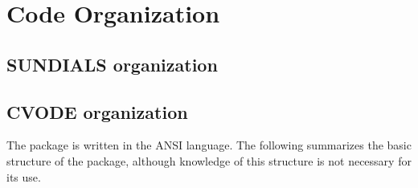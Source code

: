 \chapter{Code Organization}\label{s:organization}

\section{SUNDIALS organization}\label{ss:sun_org}


\section{CVODE organization}\label{ss:cvode_org}

The {\cvode} package is written in the ANSI {\CC} language. The following
summarizes the basic structure of the package, although knowledge
of this structure is not necessary for its use.

